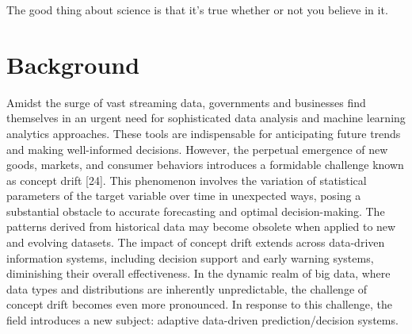 



\begin{savequote}[50mm]
The good thing about science is that it's true whether or not you believe in it. 
\end{savequote}


\chapter{Background}
\label{cha:2_background}

Amidst the surge of vast streaming data, governments and businesses find themselves in an urgent need for sophisticated data analysis and machine learning analytics approaches. These tools are indispensable for anticipating future trends and making well-informed decisions. However, the perpetual emergence of new goods, markets, and consumer behaviors introduces a formidable challenge known as concept drift [24]. This phenomenon involves the variation of statistical parameters of the target variable over time in unexpected ways, posing a substantial obstacle to accurate forecasting and optimal decision-making. The patterns derived from historical data may become obsolete when applied to new and evolving datasets.
The impact of concept drift extends across data-driven information systems, including decision support and early warning systems, diminishing their overall effectiveness. In the dynamic realm of big data, where data types and distributions are inherently unpredictable, the challenge of concept drift becomes even more pronounced. In response to this challenge, the field introduces a new subject: adaptive data-driven prediction/decision systems.
